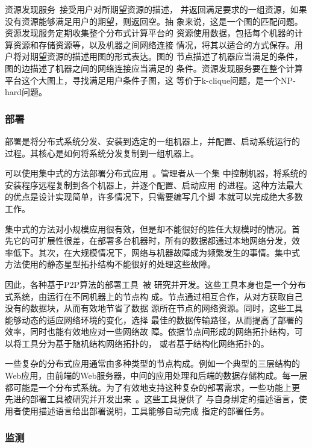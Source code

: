 资源发现服务~\cite{sword_toit, xenosearch}接受用户对所期望资源的描述，
并返回满足要求的一组资源，如果没有资源能够满足用户的期望，则返回空。抽
象来说，这是一个图的匹配问题。资源发现服务定期收集整个分布式计算平台的
资源使用数据，包括每个机器的计算资源和存储资源等，以及机器之间网络连接
情况，将其以适合的方式保存。用户将对期望资源的描述用图的形式表达。图的
节点描述了机器应当满足的条件，图的边描述了机器之间的网络连接应当满足的
条件。资源发现服务要在整个计算平台这个大图上，寻找满足用户条件子图，这
等价于k-clique问题，是一个NP-hard问题。

\subsubsection*{部署}

部署是将分布式系统分发、安装到选定的一组机器上，并配置、启动系统运行的
过程。其核心是如何将系统分发复制到一组机器上。

可以使用集中式的方法部署分布式应用~\cite{vxargs, pssh}。管理者从一个集
中控制机器，将系统的安装程序远程复制到各个机器上，并逐个配置、启动应用
的进程。这种方法最大的优点是设计实现简单，许多情况下，只需要编写几个脚
本就可以完成绝大多数工作。

集中式的方法对小规模应用很有效，但是却不能很好的胜任大规模时的情况。首
先它的可扩展性很差，在部署多台机器时，所有的数据都通过本地网络分发，效
率低下。其次，在大规模情况下，网络与机器故障成为频繁发生的事情。集中式
方法使用的静态星型拓扑结构不能很好的处理这些故障。

因此，各种基于P2P算法的部署工具~\cite{bittorrent, codeploy, sharkfs}被
研究并开发。这些工具本身也是一个分布式系统，由运行在不同机器上的节点构
成。节点通过相互合作，从对方获取自己没有的数据块，从而有效地节省了数据
源所在节点的网络资源。同时，这些工具能够动态的适应网络环境的变化，选择
最佳的数据传输路径，从而提高了部署的效率，同时也能有效地应对一些网络故
障。依据节点间形成的网络拓扑结构，可以将工具分为基于随机结构网络拓扑的，
或者基于结构化网络拓扑的。

一些复杂的分布式应用通常由多种类型的节点构成。例如一个典型的三层结构的
Web应用，由前端的Web服务器，中间的应用处理和后端的数据存储构成。每一层
都可能是一个分布式系统。为了有效地支持这种复杂的部署需求，一些功能上更
先进的部署工具被研究并开发出来~\cite{plush, smartfrog}。这些工具提供了
与自身绑定的描述语言，使用者使用描述语言给出部署说明，工具能够自动完成
指定的部署任务。

\subsubsection*{监测}

